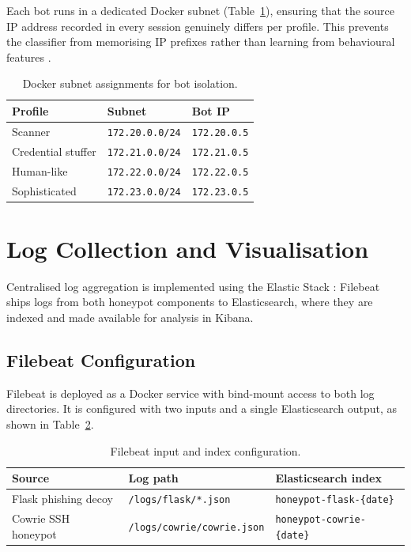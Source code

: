 Each bot runs in a dedicated Docker subnet (Table~\ref{tab:bot_subnets}),
ensuring that the source IP address recorded in every session genuinely differs
per profile. This prevents the classifier from memorising IP prefixes rather
than learning from behavioural features \cite{Rajab2007Botnet}.

\begin{table}[h]
\centering
\caption{Docker subnet assignments for bot isolation.}
\label{tab:bot_subnets}
\begin{tabular}{lll}
\hline
\textbf{Profile} & \textbf{Subnet} & \textbf{Bot IP} \\
\hline
Scanner            & \texttt{172.20.0.0/24} & \texttt{172.20.0.5} \\
Credential stuffer & \texttt{172.21.0.0/24} & \texttt{172.21.0.5} \\
Human-like         & \texttt{172.22.0.0/24} & \texttt{172.22.0.5} \\
Sophisticated      & \texttt{172.23.0.0/24} & \texttt{172.23.0.5} \\
\hline
\end{tabular}
\end{table}

\section{Log Collection and Visualisation}
\label{sec:elk}

Centralised log aggregation is implemented using the Elastic Stack
\cite{Holz2006AttackPatterns}: Filebeat ships logs from both honeypot
components to Elasticsearch, where they are indexed and made available for
analysis in Kibana.

\subsection{Filebeat Configuration}

Filebeat is deployed as a Docker service with bind-mount access to both log
directories. It is configured with two inputs and a single Elasticsearch
output, as shown in Table~\ref{tab:filebeat}.

\begin{table}[h]
\centering
\caption{Filebeat input and index configuration.}
\label{tab:filebeat}
\begin{tabular}{lll}
\hline
\textbf{Source} & \textbf{Log path} & \textbf{Elasticsearch index} \\
\hline
Flask phishing decoy & \texttt{/logs/flask/*.json}       & \texttt{honeypot-flask-\{date\}} \\
Cowrie SSH honeypot  & \texttt{/logs/cowrie/cowrie.json} & \texttt{honeypot-cowrie-\{date\}} \\
\hline
\end{tabular}
\end{table}

